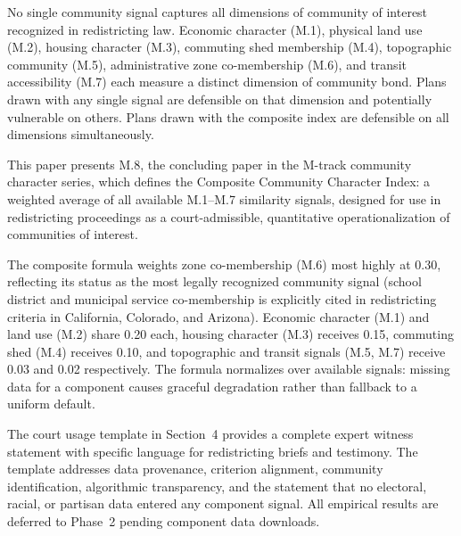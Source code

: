 No single community signal captures all dimensions of community of interest
recognized in redistricting law.
Economic character (M.1), physical land use (M.2), housing character (M.3),
commuting shed membership (M.4), topographic community (M.5), administrative
zone co-membership (M.6), and transit accessibility (M.7) each measure a
distinct dimension of community bond.
Plans drawn with any single signal are defensible on that dimension and
potentially vulnerable on others.
Plans drawn with the composite index are defensible on all dimensions
simultaneously.

This paper presents M.8, the concluding paper in the M-track community
character series, which defines the Composite Community Character Index:
a weighted average of all available M.1--M.7 similarity signals, designed
for use in redistricting proceedings as a court-admissible, quantitative
operationalization of communities of interest.

The composite formula weights zone co-membership (M.6) most highly at 0.30,
reflecting its status as the most legally recognized community signal
(school district and municipal service co-membership is explicitly cited
in redistricting criteria in California, Colorado, and Arizona).
Economic character (M.1) and land use (M.2) share 0.20 each, housing character
(M.3) receives 0.15, commuting shed (M.4) receives 0.10, and topographic
and transit signals (M.5, M.7) receive 0.03 and 0.02 respectively.
The formula normalizes over available signals: missing data for a component
causes graceful degradation rather than fallback to a uniform default.

The court usage template in Section~4 provides a complete expert witness
statement with specific language for redistricting briefs and testimony.
The template addresses data provenance, criterion alignment, community
identification, algorithmic transparency, and the statement that no
electoral, racial, or partisan data entered any component signal.
All empirical results are deferred to Phase~2 pending component data downloads.
